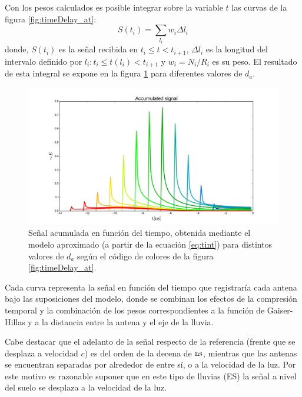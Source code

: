 	Con los pesos calculados es posible integrar sobre la variable $t$ las curvas de la figura \ref{fig:timeDelay_at}:
	\begin{equation}
	S(t_i)=\sum_{l_i}w_i\Delta l_i
	\label{eq:tint}
	\end{equation}
	donde, $S(t_i)$ es la señal recibida en $t_i\leq t<t_{i+1}$, $\Delta l_i$ es la longitud del intervalo definido por $l_i:t_i\leq t(l_i)<t_{i+1}$ y $w_i=N_i/R_i$ es su peso.
	El resultado de esta integral se expone en la figura \ref{fig:timeDelay_as} para diferentes valores de $d_a$.
	\begin{figure}[ht!]
		\centering
		\includegraphics[width=\textwidth]{./fig/EASRadio/timeDelay_as}
		\caption{\label{fig:timeDelay_as}
		Se\~nal acumulada en funci\'on del tiempo, obtenida mediante el modelo aproximado (a partir de la ecuación \ref{eq:tint}) para distintos valores de $d_a$ seg\'un el c\'odigo de colores de la figura \ref{fig:timeDelay_at}.
		}
	\end{figure}
	Cada curva representa la se\~nal en funci\'on del tiempo que registrar\'ia cada antena bajo las suposiciones del modelo, donde se combinan los efectos de la compresi\'on temporal y la combinaci\'on de los pesos correspondientes a la funci\'on de Gaiser-Hillas y a la distancia entre la antena y el eje de la lluvia.
	
	Cabe destacar que el adelanto de la señal respecto de la referencia (frente que se desplaza a velocidad $c$) es del orden de la decena de $\rm ns$, mientras que las antenas se encuentran separadas por alrededor de  entre s\'i, o  a la velocidad de la luz.
	Por este motivo es razonable suponer que en este tipo de lluvias (ES) la señal a nivel del suelo se desplaza a la velocidad de la luz.
	
